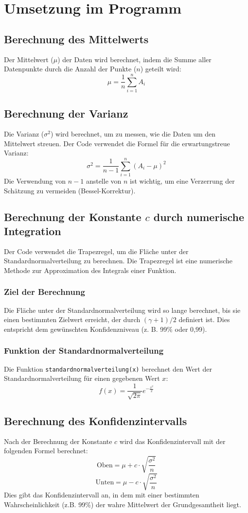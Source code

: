\section{Umsetzung im Programm}
\label{sec:umsetzung_im_programm}

\subsection{Berechnung des Mittelwerts}
Der Mittelwert (\(\mu\)) der Daten wird berechnet, indem die Summe aller Datenpunkte durch die Anzahl der Punkte (\(n\)) geteilt wird:
\[
\mu = \frac{1}{n} \sum_{i=1}^{n} A_i
\]

\subsection{Berechnung der Varianz}
Die Varianz (\(\sigma^2\)) wird berechnet, um zu messen, wie die Daten um den Mittelwert streuen. Der Code verwendet die Formel für die erwartungstreue Varianz:
\[
\sigma^2 = \frac{1}{n-1} \sum_{i=1}^{n} (A_i - \mu)^2
\]
Die Verwendung von \(n-1\) anstelle von \(n\) ist wichtig, um eine Verzerrung der Schätzung zu vermeiden (Bessel-Korrektur).

\subsection{Berechnung der Konstante \(c\) durch numerische Integration}
Der Code verwendet die Trapezregel, um die Fläche unter der Standardnormalverteilung zu berechnen. Die Trapezregel ist eine numerische Methode zur Approximation des Integrals einer Funktion.

\subsubsection{Ziel der Berechnung}
Die Fläche unter der Standardnormalverteilung wird so lange berechnet, bis sie einen bestimmten Zielwert erreicht, der durch \((\gamma + 1) / 2\) definiert ist. Dies entspricht dem gewünschten Konfidenzniveau (z. B. 99\% oder 0,99).

\subsubsection{Funktion der Standardnormalverteilung}
Die Funktion \texttt{standardnormalverteilung(x)} berechnet den Wert der Standardnormalverteilung für einen gegebenen Wert \(x\):
\[
f(x) = \frac{1}{\sqrt{2\pi}} e^{-\frac{x^2}{2}}
\]

\subsection{Berechnung des Konfidenzintervalls}
Nach der Berechnung der Konstante \(c\) wird das Konfidenzintervall mit der folgenden Formel berechnet:
\[
\text{Oben} = \mu + c \cdot \sqrt{\frac{\sigma^2}{n}}
\]
\[
\text{Unten} = \mu - c \cdot \sqrt{\frac{\sigma^2}{n}}
\]
Dies gibt das Konfidenzintervall an, in dem mit einer bestimmten Wahrscheinlichkeit (z.B. 99\%) der wahre Mittelwert der Grundgesamtheit liegt.


